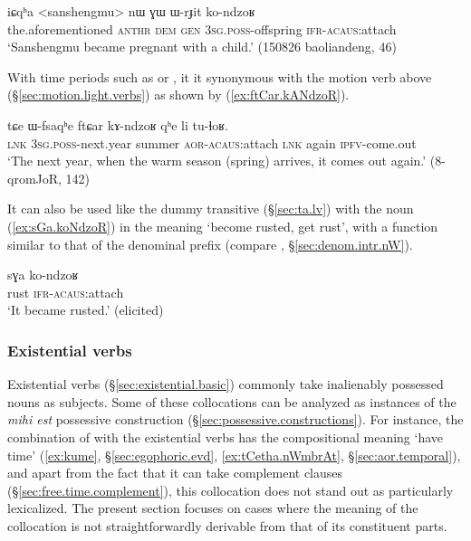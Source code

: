  \begin{exe}
\ex \label{ex:WrJit.konzdoR}
\gll iɕqʰa <sanshengmu> nɯ ɣɯ ɯ-rɟit ko-ndzoʁ \\
the.aforementioned  \textsc{anthr} \textsc{dem} \textsc{gen} \textsc{3sg}.\textsc{poss}-offspring \textsc{ifr}-\textsc{acaus}:attach \\
\glt `Sanshengmu became pregnant with a child.' (150826 baoliandeng, 46)
 \end{exe} 
  
With time periods such as  or , it it synonymous with the motion verb  above (§\ref{sec:motion.light.verbs}) as shown by (\ref{ex:ftCar.kANdzoR}).
  
\begin{exe}
\ex \label{ex:ftCar.kANdzoR}
\gll  tɕe ɯ-fsaqʰe ftɕar kɤ-ndzoʁ qʰe li tu-ɬoʁ. \\
\textsc{lnk} \textsc{3sg}.\textsc{poss}-next.year summer \textsc{aor}-\textsc{acaus}:attach \textsc{lnk} again \textsc{ipfv}-come.out \\
\glt  `The next year, when the warm season (spring) arrives, it comes out again.' (8-qromJoR, 142)
 \end{exe}  

It can also be used like the dummy transitive  (§\ref{sec:ta.lv}) with the noun  (\ref{ex:sGa.koNdzoR}) in the meaning `become rusted, get rust', with a function similar to that of the  denominal prefix (compare , §\ref{sec:denom.intr.nW}).

\begin{exe}
\ex \label{ex:sGa.koNdzoR}
\gll sɣa ko-ndzoʁ \\
rust \textsc{ifr}-\textsc{acaus}:attach  \\
\glt `It became rusted.' (elicited)
\end{exe}  

 
\subsubsection{Existential verbs} \label{sec:existential.light.verbs}
Existential verbs (§\ref{sec:existential.basic}) commonly take inalienably possessed nouns as subjects. Some of these collocations can be analyzed as instances of the \textit{mihi est} possessive construction (§\ref{sec:possessive.constructions}). For instance, the combination of  with the existential verbs has the compositional meaning `have time' (\ref{ex:kume}, §\ref{sec:egophoric.evd}, \ref{ex:tCetha.nWmbrAt}, §\ref{sec:aor.temporal}), and apart from the fact that it can take complement clauses (§\ref{sec:free.time.complement}), this collocation does not stand out as particularly lexicalized. The present section focuses on cases where the meaning of the collocation is not straightforwardly derivable from that of its constituent parts.

